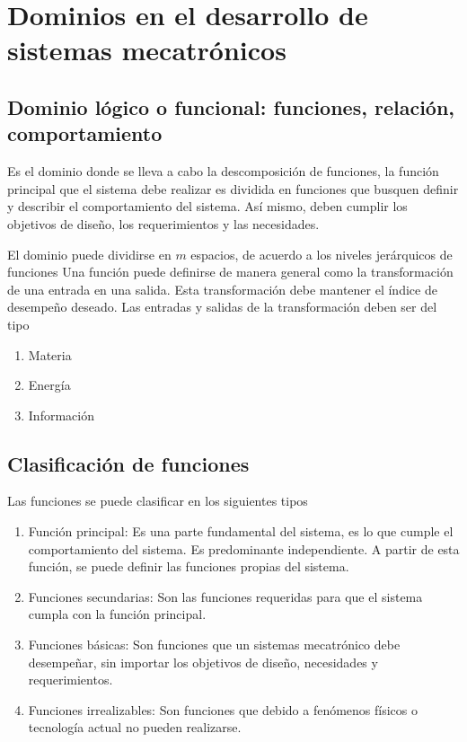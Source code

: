 \section{Dominios en el desarrollo de sistemas mecatrónicos}

\subsection{Dominio lógico o funcional: funciones, relación, comportamiento}

Es el dominio donde se lleva a cabo la descomposición de funciones, la función principal que el sistema debe realizar es dividida en funciones que busquen definir y describir el comportamiento del sistema. Así mismo, deben cumplir los objetivos de diseño, los requerimientos y las necesidades. 

El dominio puede dividirse en \( m \) espacios, de acuerdo a los niveles jerárquicos de funciones
Una función puede definirse de manera general como la transformación de una entrada en una salida. Esta transformación debe mantener el índice de desempeño deseado. Las entradas y salidas de la transformación deben ser del tipo
\begin{enumerate}
    \item Materia
    \item Energía
    \item Información
\end{enumerate}

\subsection{Clasificación de funciones}
Las funciones se puede clasificar en los siguientes tipos
\begin{enumerate}
    \item Función principal: Es una parte fundamental del sistema, es lo que cumple el comportamiento del sistema. Es predominante independiente. A partir de esta función, se puede definir las funciones propias del sistema. 
    
    \item Funciones secundarias: Son las funciones requeridas para que el sistema cumpla con la función principal.
    
    \item Funciones básicas: Son funciones que un sistemas mecatrónico debe desempeñar, sin importar los objetivos de diseño, necesidades y requerimientos.
    
    \item Funciones irrealizables: Son funciones que debido a fenómenos físicos o tecnología actual no pueden realizarse.
\end{enumerate}

